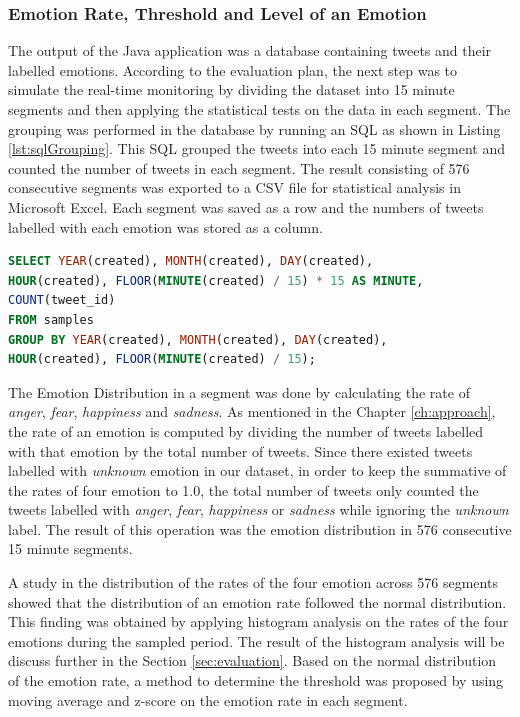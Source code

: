 \clearpage
\subsubsection{Emotion Rate, Threshold and Level of an Emotion}
The output of the Java application was a database containing tweets and their labelled emotions. According to the evaluation plan, the next step was to simulate the real-time monitoring by dividing the dataset into 15 minute segments and then applying the statistical tests on the data in each segment. The grouping was performed in the database by running an SQL as shown in Listing \ref{lst:sqlGrouping}. This SQL grouped the tweets into each 15 minute segment and counted the number of tweets in each segment. The result consisting of 576 consecutive segments was exported to a CSV file for statistical analysis in Microsoft Excel. Each segment was saved as a row and the numbers of tweets labelled with each emotion was stored as a column.

\begin{lstlisting}[language=SQL,caption=Segment Division in SQL,label=lst:sqlGrouping]
SELECT YEAR(created), MONTH(created), DAY(created), 
HOUR(created), FLOOR(MINUTE(created) / 15) * 15 AS MINUTE, 
COUNT(tweet_id) 
FROM samples 
GROUP BY YEAR(created), MONTH(created), DAY(created), 
HOUR(created), FLOOR(MINUTE(created) / 15);
\end{lstlisting}

The Emotion Distribution in a segment was done by calculating the rate of \textit{anger}, \textit{fear}, \textit{happiness} and \textit{sadness}. As mentioned in the Chapter \ref{ch:approach}, the rate of an emotion is computed by dividing the number of tweets labelled with that emotion by the total number of tweets. Since there existed tweets labelled with \textit{unknown} emotion in our dataset, in order to keep the summative of the rates of four emotion to 1.0, the total number of tweets only counted the tweets labelled with \textit{anger}, \textit{fear}, \textit{happiness} or \textit{sadness} while ignoring the \textit{unknown} label. The result of this operation was the emotion distribution in 576 consecutive 15 minute segments. 

A study in the distribution of the rates of the four emotion across 576 segments showed that the distribution of an emotion rate followed the normal distribution. This finding was obtained by applying histogram analysis on the rates of the four emotions during the sampled period. The result of the histogram analysis will be discuss further in the Section \ref{sec:evaluation}. Based on the normal distribution of the emotion rate, a method to determine the threshold was proposed by using moving average and z-score on the emotion rate in each segment. 

